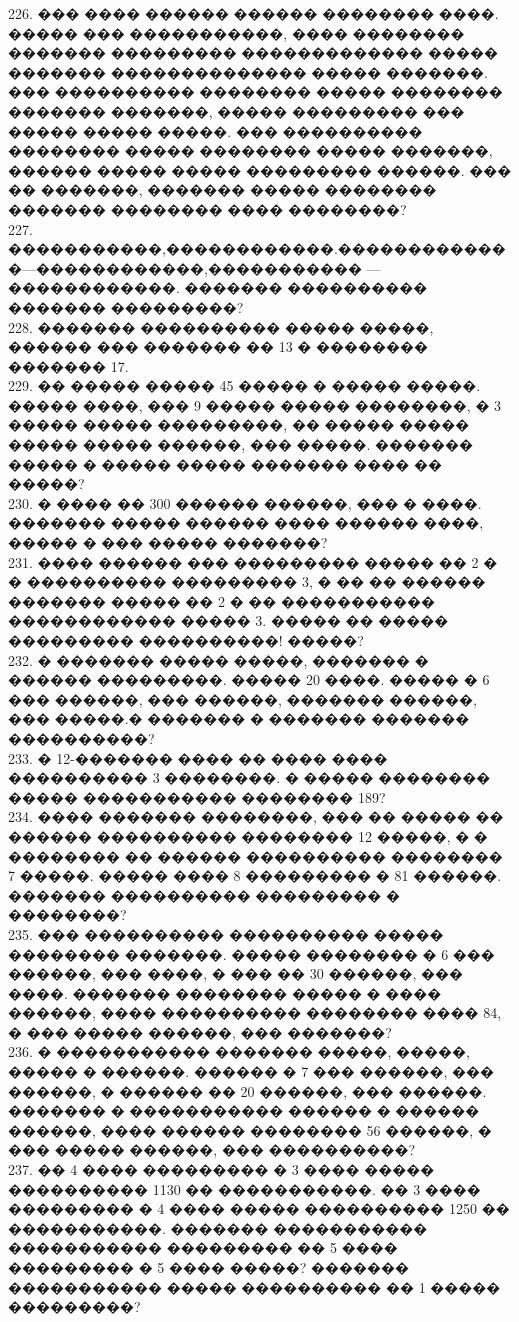 \documentclass[12pt]{article}
\begin{document}
226. ��� ���� ������ ������ �������� ����. ����� ��� �����������, ���� �������� ������� ��������� ������������� ����� ������� �������������� ����� �������. ��� ���������� �������� ����� �������� ������� �������, ����� ��������� ��� ����� ����� �����. ��� ���������� �������� ����� �������� ����� �������, ������ ����� ����� ��������� ������. ��� �� �������, ������� ����� �������� ������� �������� ���� ��������?\\
227. �����������,������������.�������������---������������,����������� ---������������. ������� ���������� ������� ���������?\\
228. ������� ���������� ����� �����, ������ ��� ������� �� 13 � �������� ������� 17.\\
229. �� ����� ����� 45 ����� � ����� �����. ����� ����, ��� 9 ����� ����� ��������, � 3 ����� ����� ���������, �� ����� ����� ����� ����� ������, ��� �����. ������� ����� � ����� ����� ������� ���� �� �����?\\
230. � ���� �� 300 ������ ������, ��� � ����. ������� ����� ������ ���� ������ ����, ����� � ��� ����� �������?\\
231. ���� ������ ��� ��������� ����� �� 2 � � ���������� ��������� 3, � �� �� ������ ������� ����� �� 2 � �� ����������� ������������ ����� 3. ����� �� ����� ��������� ����������! �����?\\
232. � ������� ����� �����, ������� � ������ ���������. ����� 20 ����. ����� � 6 ��� ������, ��� ������, ������� ������, ��� �����.�
������� � ������� ������� ����������?\\
233. � 12-������� ���� �� ���� ����  ���������� 3 ��������. � ����� �������� ����� ����������� �������� 189?\\
234. ���� ������� ��������, ��� �� ����� �� ������ ���������� �������� 12 �����, � � �������� �� ������ ���������� �������� 7 �����. ����� ���� 8 ��������� � 81 ������. ������� ���������� ��������� � ��������?\\
235. ��� ���������� ���������� ����� �������� �������. ����� �������� � 6 ��� ������, ��� ����, � ��� �� 30 ������, ��� ����. ������� �������� ����� � ���� ������, ���� ���������� �������� ���� 84, � ��� ����� ������, ��� �������?\\
236. � ����������� ������� �����, �����, ����� � ������. ������ � 7 ��� ������, ��� ������, � ������ �� 20 ������, ��� ������. ������� � ����������� ������ � ������ ������, ���� ������ �������� 56 ������, � ��� ����� ������, ��� ����������?\\
237. �� 4 ���� ��������� � 3 ���� ����� ���������� 1130 �� �����������. �� 3 ���� ��������� � 4 ���� ����� ���������� 1250 �� �����������. ������� ����������� ����������� ��������� �� 5 ���� ��������� � 5 ���� �����? ������� ����������� ����� ���������� �� 1 ����� ���������?\\
\end{document}
